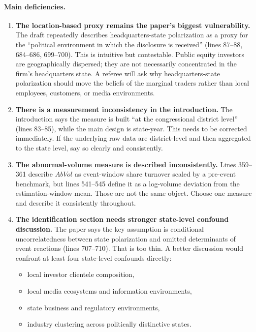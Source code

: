 \documentclass[12pt]{article}
\begin{document}
\paragraph{Main deficiencies.}

\begin{enumerate}
    \item \textbf{The location-based proxy remains the paper's biggest vulnerability.} The draft repeatedly describes headquarters-state polarization as a proxy for the ``political environment in which the disclosure is received'' (lines 87--88, 684--686, 699--700). This is intuitive but contestable. Public equity investors are geographically dispersed; they are not necessarily concentrated in the firm's headquarters state. A referee will ask why headquarters-state polarization should move the beliefs of the marginal traders rather than local employees, customers, or media environments.

    \item \textbf{There is a measurement inconsistency in the introduction.} The introduction says the measure is built ``at the congressional district level'' (lines 83--85), while the main design is state-year. This needs to be corrected immediately. If the underlying raw data are district-level and then aggregated to the state level, say so clearly and consistently.

    \item \textbf{The abnormal-volume measure is described inconsistently.} Lines 359--361 describe $AbVol$ as event-window share turnover scaled by a pre-event benchmark, but lines 541--545 define it as a log-volume deviation from the estimation-window mean. Those are not the same object. Choose one measure and describe it consistently throughout.

    \item \textbf{The identification section needs stronger state-level confound discussion.} The paper says the key assumption is conditional uncorrelatedness between state polarization and omitted determinants of event reactions (lines 707--710). That is too thin. A better discussion would confront at least four state-level confounds directly:
    \begin{itemize}
        \item local investor clientele composition,
        \item local media ecosystems and information environments,
        \item state business and regulatory environments,
        \item industry clustering across politically distinctive states.
    \end{itemize}


\end{enumerate}
\end{document}
